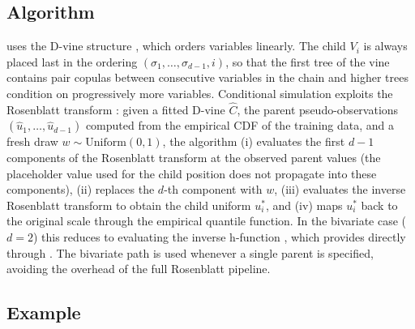\documentclass[article]{jss}
\begin{document}
\subsection{Algorithm}

 uses the D-vine structure \citep{dissmann2013selecting}, which
orders variables linearly. The child $V_i$ is always placed last in the ordering
$(\sigma_1, \ldots, \sigma_{d-1}, i)$, so that the first tree of the vine
contains pair copulas between consecutive variables in the chain and higher trees
condition on progressively more variables. Conditional simulation exploits the
Rosenblatt transform \citep{rosenblatt1952remarks}: given a fitted D-vine
$\hat{C}$, the parent pseudo-observations
$(\hat{u}_1, \ldots, \hat{u}_{d-1})$ computed from the empirical CDF of the
training data, and a fresh draw $w \sim \mathrm{Uniform}(0,1)$, the algorithm (i)
evaluates the first $d-1$ components of the Rosenblatt transform at the observed
parent values (the placeholder value used for the child position does not propagate
into these components), (ii) replaces the $d$-th component with $w$, (iii)
evaluates the inverse Rosenblatt transform to obtain the child uniform $u_i^*$, and
(iv) maps $u_i^*$ back to the original scale through the empirical quantile
function. In the bivariate case ($d = 2$) this reduces to evaluating the inverse
h-function \citep{aas2009pair}, which  provides directly through
. The bivariate path is used whenever a single
parent is specified, avoiding the overhead of the full Rosenblatt pipeline.

\subsection{Example}

\end{document}
